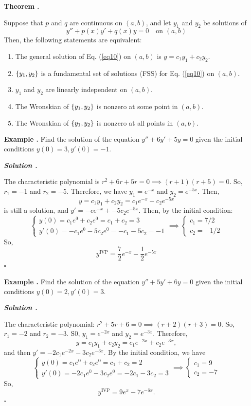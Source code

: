 \documentclass[12pt, a4paper]{article}
\newcounter{index}[subsection]
\newenvironment*{eg}{\begin{framed}\par\noindent\textbf{Example \thesubsection.\stepcounter{index}\theindex}}{\par\end{framed}}
\newenvironment*{thm}[1]{\begin{tcolorbox}\par\noindent\textbf{Theorem \thesubsection.\stepcounter{index}\theindex\ #1} \par}{\par\end{tcolorbox}}
\newcounter{nprf}[subsection]
\newenvironment*{sol}{\par\indent\textbf{\textit{Solution \stepcounter{nprf}\thenprf.}}\par}{\hfill{$\square$}\par}
\begin{document}
\begin{thm}{}
	Suppose that $p$ and $q$ are continuous on $(a,b)$, and let $y_1$ and $y_2$ be solutions of \begin{equation}\label{eq10}
		y''+p(x)y'+q(x)y=0\quad\text{on }(a,b)
	\end{equation}
	Then, the following statements are equivalent: 
	\begin{enumerate}
		\item The general solution of Eq. (\ref{eq10}) on $(a,b)$ is $y=c_1y_1+c_2y_2$.
		\item $\qty{y_1,y_2}$ is a fundamental set of solutions (FSS) for Eq. (\ref{eq10}) on $(a,b)$.
		\item $y_1$ and $y_2$ are linearly independent on $(a,b)$.
		\item The Wronskian of $\qty{y_1,y_2}$ is nonzero at some point in $(a,b)$.
		\item The Wronskian of $\qty{y_1,y_2}$ is nonzero at all points in $(a,b)$.
	\end{enumerate}
\end{thm}
\begin{eg}
	Find the solution of the equation $y''+6y'+5y=0$ given the initial conditions $y(0)=3, y'(0)=-1$.
	\begin{sol}
		The characteristic polynomial is $r^2+6r+5r=0\implies(r+1)(r+5)=0$. So, $r_1=-1$ and $r_2=-5$. Therefore, we have $y_1=e^{-x}$ and $y_2=e^{-5x}$. Then, \[y=c_1y_1+c_2y_2=c_1e^{-x}+c_2e^{-5x}\] is still a solution, and $y'=-ce^{-x}+-5c_2e^{-5x}$. Then, by the initial condition: \[\begin{cases}y(0)=c_1e^0+c_2e^0=c_1+c_2=3\\y'(0)=-c_1e^0-5c_2e^0=-c_1-5c_2=-1\end{cases}\implies\begin{cases}c_1=7/2\\c_2=-1/2\end{cases}\] So, \[y^\text{IVP}=\dfrac{7}{2}e^{-x}-\dfrac{1}{2}e^{-5x}\]
	\end{sol}
\end{eg}
\begin{eg}
	Find the solution of the equation $y''+5y'+6y=0$ given the initial conditions $y(0)=2, y'(0)=3$.
	\begin{sol}
		The characteristic polynomial: $r^2+5r+6=0\implies(r+2)(r+3)=0$. So, $r_1=-2$ and $r_2=-3$. S0, $y_1=e^{-2x}$ and $y_2=e^{-3x}$. Therefore, \[y=c_1y_1+c_2y_2=c_1e^{-2x}+c_2e^{-3x},\] and then $y'=-2c_1e^{-2x}-3c_2e^{-3x}$. By the initial condition, we have \[\begin{cases}y(0)=c_1e^0+c_2e^0=c_1+c_2=2\\y'(0)=-2c_1e^0-3c_2e^0=-2c_1-3c_2=3\end{cases}\implies\begin{cases}c_1=9\\c_2=-7\end{cases}\] So, \[y^\text{IVP}=9e^x-7e^{-6x}.\]
	\end{sol}
\end{eg}
\end{document}
